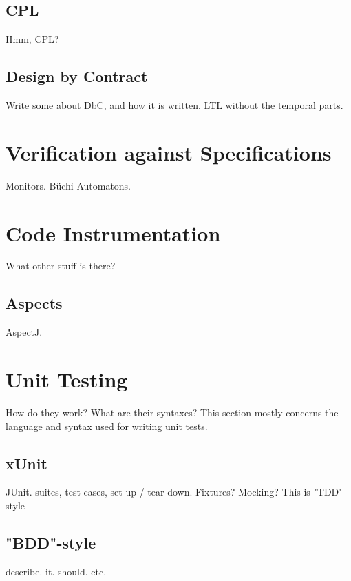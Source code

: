 \documentclass[a4paper,11pt]{kth-mag}
\begin{document}
\subsection{CPL}

Hmm, CPL?

\subsection{Design by Contract}

Write some about DbC, and how it is written. LTL without the temporal parts.

\section{Verification against Specifications}

Monitors. Büchi Automatons.

\section{Code Instrumentation}

What other stuff is there?

\subsection{Aspects}
AspectJ.

\section{Unit Testing}

How do they work? What are their syntaxes? This section mostly concerns the language and syntax used for writing unit tests.

\subsection{xUnit}

JUnit. suites, test cases, set up / tear down. Fixtures? Mocking? This is "TDD"-style

\subsection{"BDD"-style}

describe. it. should. etc.






\end{document}
